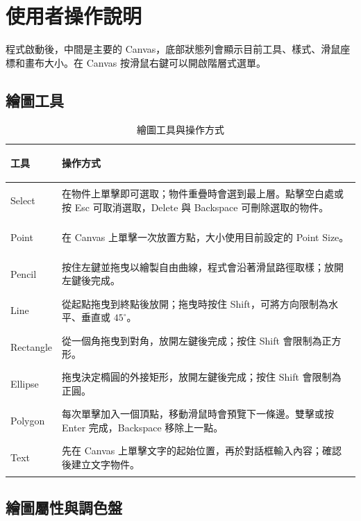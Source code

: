 \section{使用者操作說明}

程式啟動後，中間是主要的 Canvas，底部狀態列會顯示目前工具、樣式、滑鼠座標和畫布大小。在 Canvas 按滑鼠右鍵可以開啟階層式選單。

\subsection{繪圖工具}

\begin{table}[H]
    \centering
    \caption{繪圖工具與操作方式}
    \begin{tabularx}{\textwidth}{>{\bfseries\raggedright\arraybackslash}p{} X}
        \toprule
        工具        & 操作方式                                                                  \\
        \midrule
        Select    & 在物件上單擊即可選取；物件重疊時會選到最上層。點擊空白處或按 Esc 可取消選取，Delete 與 Backspace 可刪除選取的物件。 \\
        Point     & 在 Canvas 上單擊一次放置方點，大小使用目前設定的 Point Size。                              \\
        Pencil    & 按住左鍵並拖曳以繪製自由曲線，程式會沿著滑鼠路徑取樣；放開左鍵後完成。                                   \\
        Line      & 從起點拖曳到終點後放開；拖曳時按住 Shift，可將方向限制為水平、垂直或 $45^\circ$。                     \\
        Rectangle & 從一個角拖曳到對角，放開左鍵後完成；按住 Shift 會限制為正方形。                                   \\
        Ellipse   & 拖曳決定橢圓的外接矩形，放開左鍵後完成；按住 Shift 會限制為正圓。                                  \\
        Polygon   & 每次單擊加入一個頂點，移動滑鼠時會預覽下一條邊。雙擊或按 Enter 完成，Backspace 移除上一點。                \\
        Text      & 先在 Canvas 上單擊文字的起始位置，再於對話框輸入內容；確認後建立文字物件。                             \\
        \bottomrule
    \end{tabularx}
\end{table}

\subsection{繪圖屬性與調色盤}
\label{sec:paint-style}

